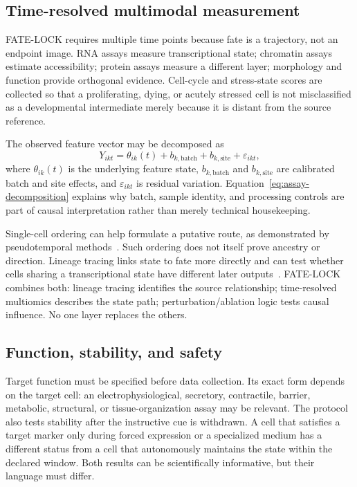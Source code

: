\documentclass[10pt,conference]{IEEEtran}
\begin{document}
\subsection{Time-resolved multimodal measurement}

FATE-LOCK requires multiple time points because fate is a trajectory, not an endpoint image. RNA assays measure transcriptional state; chromatin assays estimate accessibility; protein assays measure a different layer; morphology and function provide orthogonal evidence. Cell-cycle and stress-state scores are collected so that a proliferating, dying, or acutely stressed cell is not misclassified as a developmental intermediate merely because it is distant from the source reference.

The observed feature vector may be decomposed as
\begin{equation}
Y_{ikt}=\theta_{ik}(t)+b_{k,\mathrm{batch}}+b_{k,\mathrm{site}}+\varepsilon_{ikt},
\label{eq:assay-decomposition}
\end{equation}
where $\theta_{ik}(t)$ is the underlying feature state, $b_{k,\mathrm{batch}}$ and $b_{k,\mathrm{site}}$ are calibrated batch and site effects, and $\varepsilon_{ikt}$ is residual variation. Equation~\eqref{eq:assay-decomposition} explains why batch, sample identity, and processing controls are part of causal interpretation rather than merely technical housekeeping.

Single-cell ordering can help formulate a putative route, as demonstrated by pseudotemporal methods~\cite{trapnell2014}. Such ordering does not itself prove ancestry or direction. Lineage tracing links state to fate more directly and can test whether cells sharing a transcriptional state have different later outputs~\cite{weinreb2020}. FATE-LOCK combines both: lineage tracing identifies the source relationship; time-resolved multiomics describes the state path; perturbation/ablation logic tests causal influence. No one layer replaces the others.

\subsection{Function, stability, and safety}

Target function must be specified before data collection. Its exact form depends on the target cell: an electrophysiological, secretory, contractile, barrier, metabolic, structural, or tissue-organization assay may be relevant. The protocol also tests stability after the instructive cue is withdrawn. A cell that satisfies a target marker only during forced expression or a specialized medium has a different status from a cell that autonomously maintains the state within the declared window. Both results can be scientifically informative, but their language must differ.
\end{document}
